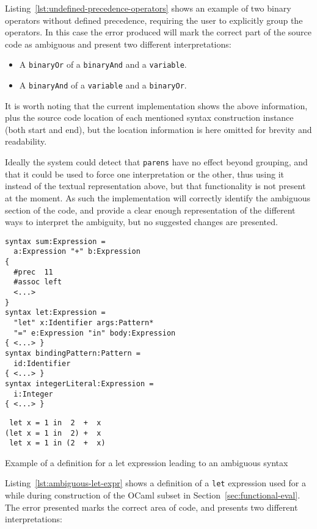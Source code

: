 \documentclass{kththesis}
\begin{document}
Listing~\ref{lst:undefined-precedence-operators} shows an example of two binary operators without defined precedence, requiring the user to explicitly group the operators. In this case the error produced will mark the correct part of the source code as ambiguous and present two different interpretations:

\begin{itemize}
  \item A \texttt{binaryOr} of a \texttt{binaryAnd} and a \texttt{variable}.
  \item A \texttt{binaryAnd} of a \texttt{variable} and a \texttt{binaryOr}.
\end{itemize}

It is worth noting that the current implementation shows the above information, plus the source code location of each mentioned syntax construction instance (both start and end), but the location information is here omitted for brevity and readability.

Ideally the system could detect that \texttt{parens} have no effect beyond grouping, and that it could be used to force one interpretation or the other, thus using it instead of the textual representation above, but that functionality is not present at the moment. As such the implementation will correctly identify the ambiguous section of the code, and provide a clear enough representation of the different ways to interpret the ambiguity, but no suggested changes are presented.

\begin{listing}[h]
\begin{verbatim}
syntax sum:Expression =
  a:Expression "+" b:Expression
{
  #prec  11
  #assoc left
  <...>
}
syntax let:Expression =
  "let" x:Identifier args:Pattern*
  "=" e:Expression "in" body:Expression
{ <...> }
syntax bindingPattern:Pattern =
  id:Identifier
{ <...> }
syntax integerLiteral:Expression =
  i:Integer
{ <...> }
\end{verbatim}
\begin{verbatim}
 let x = 1 in  2  +  x
(let x = 1 in  2) +  x
 let x = 1 in (2  +  x)
\end{verbatim}
\caption{Example of a definition for a let expression leading to an ambiguous syntax}
\label{lst:ambiguous-let-expr}
\end{listing}

Listing~\ref{lst:ambiguous-let-expr} shows a definition of a \texttt{let} expression used for a while during construction of the OCaml subset in Section~\ref{sec:functional-eval}. The error presented marks the correct area of code, and presents two different interpretations:
\end{document}
